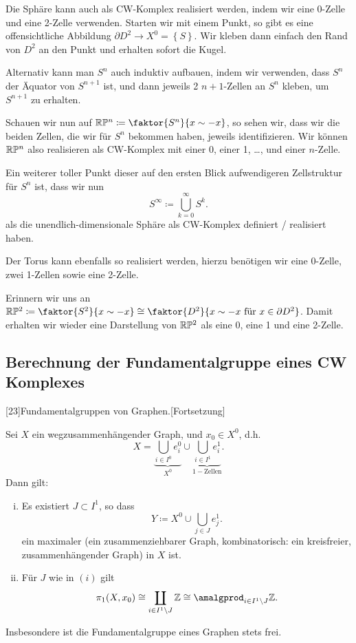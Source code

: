 \begin{example}
    Die Sphäre kann auch als CW-Komplex realisiert werden, indem wir eine 0-Zelle und eine 2-Zelle verwenden. Starten wir mit einem Punkt, so gibt es eine offensichtliche Abbildung $\partial D^2 \to  X^0 = \left \{S\right\} $. Wir kleben dann einfach den Rand von $D^2$ an den Punkt und erhalten sofort die Kugel.

    Alternativ kann man $S^n$ auch induktiv aufbauen, indem wir verwenden, dass  $S^n$ der Äquator von  $S^{n+1}$ ist, und dann jeweils 2 $n+1$-Zellen an  $S^n$ kleben, um  $S^{n+1}$ zu erhalten.

    Schauen wir nun auf $\R\mathbb{P}^n \coloneqq  \faktor{S^n}{x \sim -x}$, so sehen wir, dass wir die beiden Zellen, die wir für $S^n$ bekommen haben, jeweils identifizieren. Wir können  $\mathbb{R}\mathbb{P}^n$ also realisieren als CW-Komplex mit einer 0, einer 1, \ldots, und einer $n$-Zelle.

    Ein weiterer toller Punkt dieser auf den ersten Blick aufwendigeren Zellstruktur für  $S^n $ ist, dass wir nun
    \[
    S^{\infty} \coloneqq  \bigcup_{k=0}^{\infty} S^k 
    .\] 
    als die unendlich-dimensionale Sphäre als CW-Komplex definiert / realisiert haben.

    Der Torus kann ebenfalls so realisiert werden, hierzu benötigen wir eine 0-Zelle, zwei 1-Zellen sowie eine 2-Zelle.

    Erinnern wir uns an $\R\mathbb{P}^2 \coloneqq  \faktor{S^2}{x \sim  -x} \cong \faktor{D^2}{x \sim  -x \text{ für }x \in \partial D^2}$. Damit erhalten wir wieder eine Darstellung von $\mathbb{R}\mathbb{P}^2$ als eine 0, eine 1 und eine 2-Zelle.
\end{example}


\subsection{Berechnung der Fundamentalgruppe eines CW Komplexes}

[23]{Fundamentalgruppen von Graphen.}[Fortsetzung]

\begin{theorem}[Graphen]\label{thm:fundamentalgruppe-von-graphen}
    Sei $X$ ein wegzusammenhängender Graph, und  $x_0\in X^0$, d.h.
    \[
    X = \underbrace{\bigcup_{i \in  I^0} e_i^0 }_{X^0} \cup \underbrace{\bigcup_{i \in  I^1} e_i^1
}_{1-\text{Zellen}} 
    .\]
    Dann gilt:
    \begin{enumerate}[(i)]
        \item Es existiert $J\subset I^1$, so dass
            \[
            Y \coloneqq  X^0 \cup \bigcup_{j\in J} e_j^1
            .\] 
            ein maximaler  (ein zusammenziehbarer Graph, kombinatorisch: ein kreisfreier, zusammenhängender Graph) in $X$ ist. 
        \item Für $J$ wie in  $(i)$ gilt
             \[
                 \pi_1(X,x_0) \cong \coprod_{i\in I^1 \setminus J} \Z \cong \amalgprod_{i\in I^1 \setminus J} \Z
            .\] 
    \end{enumerate}
    Insbesondere ist die Fundamentalgruppe eines Graphen stets frei.
\end{theorem}

